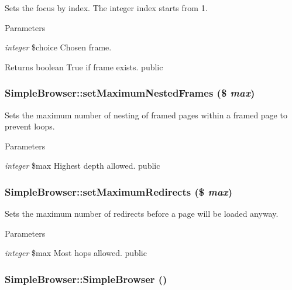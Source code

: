 \label{class_simple_browser_a942e65249c816e9eb63d068f41e516f7}
Sets the focus by index. The integer index starts from 1. 
\begin{DoxyParams}{Parameters}
\item[{\em integer}]\$choice Chosen frame. \end{DoxyParams}
\begin{DoxyReturn}{Returns}
boolean True if frame exists.  public 
\end{DoxyReturn}
\hypertarget{class_simple_browser_a18e17ed56274ec6ac5e4e53c81ae51dc}{
\subsubsection[{setMaximumNestedFrames}]{\setlength{\rightskip}{0pt plus 5cm}SimpleBrowser::setMaximumNestedFrames (\$ {\em max})}}
\label{class_simple_browser_a18e17ed56274ec6ac5e4e53c81ae51dc}
Sets the maximum number of nesting of framed pages within a framed page to prevent loops. 
\begin{DoxyParams}{Parameters}
\item[{\em integer}]\$max Highest depth allowed.  public \end{DoxyParams}
\hypertarget{class_simple_browser_af5e0f1852c449c6ee4325bd48960161d}{
\subsubsection[{setMaximumRedirects}]{\setlength{\rightskip}{0pt plus 5cm}SimpleBrowser::setMaximumRedirects (\$ {\em max})}}
\label{class_simple_browser_af5e0f1852c449c6ee4325bd48960161d}
Sets the maximum number of redirects before a page will be loaded anyway. 
\begin{DoxyParams}{Parameters}
\item[{\em integer}]\$max Most hops allowed.  public \end{DoxyParams}
\hypertarget{class_simple_browser_a91c688a632c8e9378d82bc9cad80ed2a}{
\subsubsection[{SimpleBrowser}]{\setlength{\rightskip}{0pt plus 5cm}SimpleBrowser::SimpleBrowser ()}}
